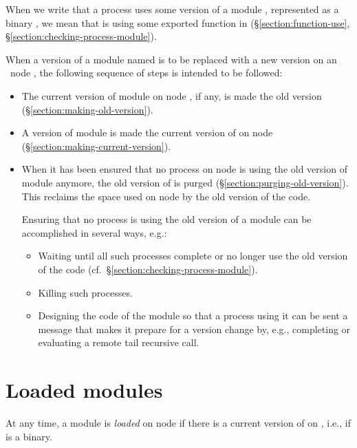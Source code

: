 When we write that a process  uses some version of a module ,
represented as a binary , we mean that  is
using\label{section:process-using-module}
some exported function  in  (\S\ref{section:function-use},
\S\ref{section:checking-process-module}).

When a version of a module named  is to be replaced with a
new version on an \Erlang\ node
, the following sequence of steps is intended to be followed:
\begin{itemize}
\item The current version of module  on node , if any,
is made the old version (\S\ref{section:making-old-version}).
\item A version of module  is made the current version of 
on node  (\S\ref{section:making-current-version}).
\item When it has been ensured that no process on node  is using the old version
of module  anymore,
the old version of  is purged (\S\ref{section:purging-old-version}).
This reclaims the space used on node  by the old version of the code.

Ensuring that no process is using the old version
of a module can be accomplished in several ways, e.g.:
\begin{itemize}
\item Waiting until all such processes complete or no longer use the old version
of the code (cf.\ \S\ref{section:checking-process-module}).
\item Killing such processes.
\item Designing the code of the module so that a process using it can be sent a message that
makes it prepare for a version change by, e.g., completing or evaluating a remote
tail recursive call.
\end{itemize}
\end{itemize}

\section{Loaded modules}

\label{section:loaded-modules}

At any time, a module is \emph{loaded} on node  if there is a current version of
 on , i.e., if  is a binary.


